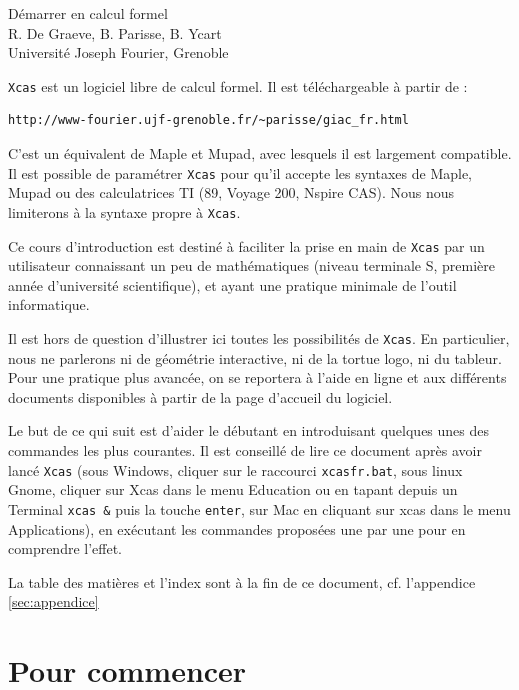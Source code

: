 \documentclass{article}
\begin{document}
\vspace*{1cm}
\begin{center}
{\Huge D\'emarrer en calcul formel}\\[6ex]
{\Large R. De Graeve, B. Parisse, B. Ycart}\\[3ex]
{\large Universit\'e Joseph Fourier, Grenoble}
\end{center}

{\tt Xcas} est un logiciel libre de calcul formel.
Il est t\'el\'echargeable \`a partir de :
{\small
\begin{verbatim}
http://www-fourier.ujf-grenoble.fr/~parisse/giac_fr.html
\end{verbatim}
}
C'est un \'equivalent de Maple et Mupad, avec lesquels il est
largement compatible. Il est possible de param\'etrer {\tt Xcas} pour qu'il
accepte les syntaxes de Maple, Mupad ou des calculatrices TI (89, Voyage 200, Nspire CAS).
Nous nous limiterons \`a la syntaxe propre \`a \verb|Xcas|. 

Ce cours d'introduction est destin\'e \`a faciliter la prise en main
de {\tt Xcas} par un utilisateur connaissant un peu de math\'ematiques
(niveau terminale S, premi\` ere ann\'ee d'universit\'e scientifique), 
et ayant une pratique minimale de l'outil informatique. 

Il est hors de question d'illustrer ici toutes les possibilit\'es 
de {\tt Xcas}. En particulier, nous ne parlerons ni de g\'eom\'etrie
interactive, ni de la tortue logo, ni du tableur. Pour une pratique plus
avanc\'ee, on se reportera \`a l'aide en ligne et aux diff\'erents
documents disponibles \`a partir de la page d'accueil du logiciel.
   
Le but de ce qui suit est d'aider le d\'ebutant en introduisant quelques unes 
des commandes les plus courantes. 
Il est conseill\'e de lire ce document apr\`es avoir lanc\'e {\tt Xcas} (sous 
Windows, cliquer sur le raccourci {\tt xcasfr.bat}, sous linux Gnome, cliquer 
sur Xcas dans le menu Education ou en tapant depuis un Terminal {\tt xcas \&}
 puis la touche {\tt enter}, sur Mac en cliquant sur xcas dans le menu 
Applications), 
en ex\'ecutant les commandes propos\'ees une par une pour en 
comprendre l'effet. 

La table des mati\`eres et l'index sont \`a la fin de ce document,
cf. l'appendice \ref{sec:appendice}

\section{Pour commencer}
\end{document}
